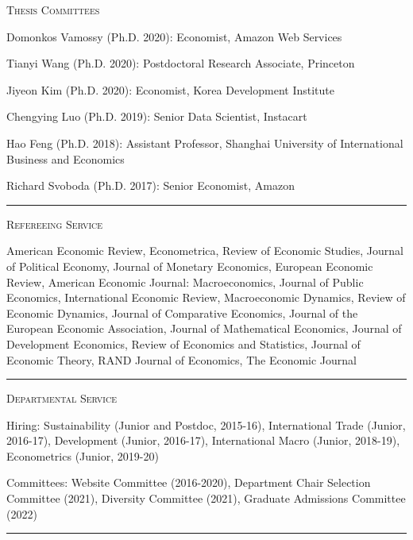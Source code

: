 \documentclass{article}
\begin{document}
\parbox{\textwidth}{
\parbox[t]{0.28\textwidth}{ \raggedright \noindent \textsc{ Thesis Committees } }
\parbox[t]{0.72\textwidth}{ \raggedright

Domonkos Vamossy (Ph.D. 2020): Economist, Amazon Web Services
\vspace{0.27cm}

Tianyi Wang (Ph.D. 2020): Postdoctoral Research Associate, Princeton
\vspace{0.27cm}

Jiyeon Kim (Ph.D. 2020): Economist, Korea Development Institute
\vspace{0.27cm}

Chengying Luo (Ph.D. 2019): Senior Data Scientist, Instacart
\vspace{0.27cm}

Hao Feng (Ph.D. 2018): Assistant Professor, Shanghai University of International Business and Economics
\vspace{0.27cm}

Richard Svoboda (Ph.D. 2017): Senior Economist, Amazon
\vspace{0.27cm}

}
\textcolor{light-gray}{\hrule}
}
\vspace{0.3cm}

\parbox{\textwidth}{
\parbox[t]{0.28\textwidth}{ \raggedright \noindent \textsc{ Refereeing Service } }
\parbox[t]{0.72\textwidth}{ \raggedright

American Economic Review, Econometrica, Review of Economic Studies, Journal of Political Economy, Journal of Monetary Economics, European Economic Review, American Economic Journal: Macroeconomics, Journal of Public Economics, International Economic Review, Macroeconomic Dynamics, Review of Economic Dynamics, Journal of Comparative Economics, Journal of the European Economic Association, Journal of Mathematical Economics, Journal of Development Economics, Review of Economics and Statistics, Journal of Economic Theory, RAND Journal of Economics, The Economic Journal
\vspace{0.27cm}

}
\textcolor{light-gray}{\hrule}
}
\vspace{0.3cm}

\parbox{\textwidth}{
\parbox[t]{0.28\textwidth}{ \raggedright \noindent \textsc{ Departmental Service } }
\parbox[t]{0.72\textwidth}{ \raggedright

Hiring: Sustainability (Junior and Postdoc, 2015-16), International Trade (Junior, 2016-17), Development (Junior, 2016-17), International Macro (Junior, 2018-19), Econometrics (Junior, 2019-20)
\vspace{0.27cm}

Committees: Website Committee (2016-2020), Department Chair Selection Committee (2021), Diversity Committee (2021), Graduate Admissions Committee (2022)
\vspace{0.27cm}

}
\textcolor{light-gray}{\hrule}
}
\vspace{0.3cm}
\end{document}
